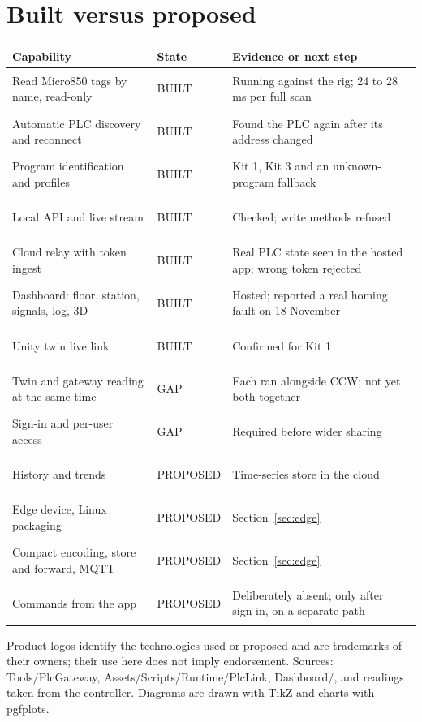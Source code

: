 \documentclass[a4paper,10.5pt]{article}
\newcommand{\code}[1]{{\ttfamily\small #1}}
\newcommand{\built}{\colorbox{datasoft}{\scriptsize\strut BUILT}}
\newcommand{\prop}{\colorbox{edgesoft}{\scriptsize\strut PROPOSED}}
\newcommand{\gap}{\colorbox{warnsoft}{\scriptsize\strut GAP}}
\begin{document}
\section{Built versus proposed}
\begin{tabularx}{\textwidth}{@{}>{\raggedright\arraybackslash}p{62mm}lY@{}}
\toprule
\textbf{Capability} & \textbf{State} & \textbf{Evidence or next step} \\
\midrule
Read Micro850 tags by name, read-only & \built & Running against the rig; 24 to 28 ms per full scan \\
Automatic PLC discovery and reconnect & \built & Found the PLC again after its address changed \\
Program identification and profiles & \built & Kit 1, Kit 3 and an unknown-program fallback \\
Local API and live stream & \built & Checked; write methods refused \\
Cloud relay with token ingest & \built & Real PLC state seen in the hosted app; wrong token rejected \\
Dashboard: floor, station, signals, log, 3D & \built & Hosted; reported a real homing fault on 18 November \\
Unity twin live link & \built & Confirmed for Kit 1 \\
Twin and gateway reading at the same time & \gap & Each ran alongside CCW; not yet both together \\
Sign-in and per-user access & \gap & Required before wider sharing \\
History and trends & \prop & Time-series store in the cloud \\
Edge device, Linux packaging & \prop & Section~\ref{sec:edge} \\
Compact encoding, store and forward, MQTT & \prop & Section~\ref{sec:edge} \\
Commands from the app & \prop & Deliberately absent; only after sign-in, on a separate path \\
\bottomrule
\end{tabularx}

\vfill
{\scriptsize\color{sub}Product logos identify the technologies used or proposed and are trademarks of their owners; their use here does not imply endorsement.
Sources: \code{Tools/PlcGateway}, \code{Assets/Scripts/Runtime/PlcLink}, \code{Dashboard/}, and readings taken from the controller.
Diagrams are drawn with TikZ and charts with pgfplots.}
\end{document}
